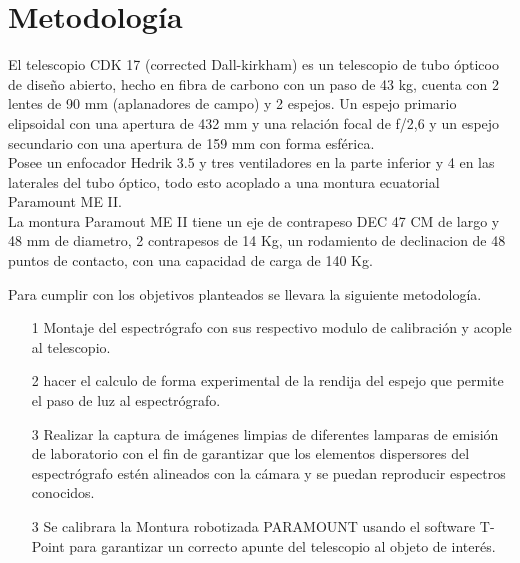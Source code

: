 
\newpage
\chapter{Metodolog\'ia}

El telescopio CDK 17 (corrected Dall-kirkham) es un telescopio de tubo ópticoo de diseño abierto, hecho en fibra de carbono con un paso de 43 kg, cuenta con 2 lentes de 90 mm (aplanadores de campo) y 2 espejos. 
Un espejo primario elipsoidal con una apertura de 432 mm y una relación focal de f/2,6 y un espejo secundario con una apertura de 159 mm con forma esférica.\\
Posee un enfocador Hedrik 3.5 y tres ventiladores en la parte inferior y 4 en las laterales del tubo óptico, todo esto acoplado a una montura ecuatorial Paramount ME II.\\
La montura Paramout ME II tiene un eje de contrapeso DEC 47 CM  de largo y 48 mm de diametro, 2 contrapesos de 14 Kg, un rodamiento de declinacion de 48 puntos de contacto, con una capacidad de carga de 140 Kg.


Para cumplir con los objetivos planteados se llevara la siguiente metodología.

\begin{itemize}

\item[1] Montaje del espectrógrafo con sus respectivo modulo de calibración y acople al telescopio.

\item[2] hacer el calculo de forma experimental de la rendija del espejo que permite el paso de luz al espectrógrafo.

\item[3] Realizar la captura de imágenes limpias de diferentes lamparas de emisión de laboratorio con el fin de garantizar que los elementos dispersores del espectrógrafo estén alineados con la cámara y se puedan reproducir espectros conocidos.

\item[3] Se calibrara la Montura robotizada PARAMOUNT  usando el software T-Point para garantizar un correcto apunte del telescopio al objeto de interés.



 
\end{itemize}



